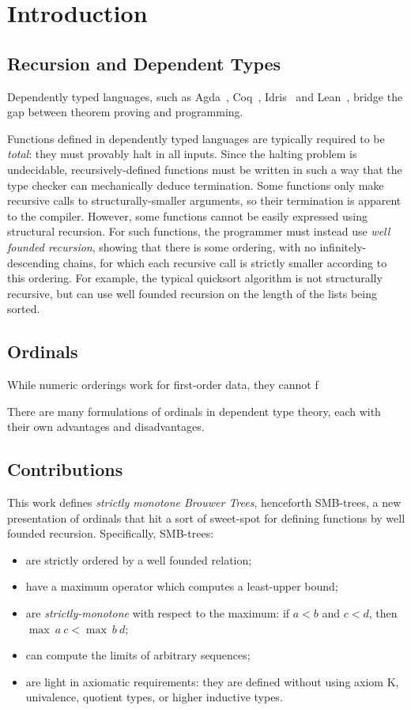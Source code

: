 \section{Introduction}

\subsection{Recursion and Dependent Types}
Dependently typed languages, such as Agda~\citep{TODO}, Coq~\citep{coqart},
Idris~\citep{TODO} and Lean~\citep{TODO}, bridge the gap between theorem
proving and programming.

Functions defined in dependently typed languages are typically required to be
\textit{total}: they must provably halt in all inputs. Since the halting problem
is undecidable, recursively-defined functions must be written in such a way that the type checker
can mechanically deduce termination.
Some functions only make recursive calls to structurally-smaller arguments,
so their termination is apparent to the compiler. However, some functions
cannot be easily expressed using structural recursion.
For such functions, the programmer must instead use \textit{well founded recursion}, showing that there is some ordering, with no infinitely-descending
chains, for which each recursive call is strictly smaller according to this ordering. For example, the typical quicksort algorithm is not structurally recursive, but can use well founded recursion on the length of the lists being sorted.

\subsection{Ordinals}

While numeric orderings work for first-order data, they cannot f

There are many formulations of ordinals in dependent type theory, each with their own advantages and disadvantages.


\subsection{Contributions}

This work defines \textit{strictly monotone Brouwer Trees}, henceforth SMB-trees,
a new presentation of ordinals that hit a sort of sweet-spot for defining functions by
well founded recursion. Specifically, SMB-trees:

\begin{itemize}
  \item are strictly ordered by a well founded relation;
  \item have a maximum operator which computes a least-upper bound;
  \item are \textit{strictly-monotone} with respect to the maximum: if $a < b$ and $c < d$, then $\max\ a\ c < \max\ b\ d$;
  \item can compute the limits of arbitrary sequences;
  \item are light in axiomatic requirements: they are defined without using axiom K,
        univalence, quotient types, or higher inductive types.
\end{itemize}


